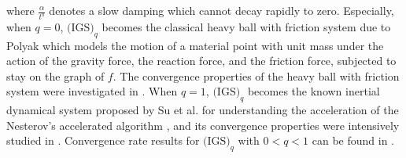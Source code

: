 \documentclass[review]{elsarticle}
\begin{document}
where $\frac{\alpha}{t^{q}}$ denotes a slow damping which  cannot decay rapidly to zero. Especially, when $q=0$, $\text{(IGS)}_{q}$ becomes  the classical heavy ball with friction system due to Polyak \cite{Polyak(1964)} which  models  the motion of a material point with unit mass under the action of the gravity force, the reaction force, and the friction force, subjected to stay on the graph of $f$. The convergence properties of  the heavy ball with friction system  were  investigated in \cite{Alvarezon(2000), Begoutbj(2015)}. When $q=1$, $\text{(IGS)}_{q}$ becomes the known inertial dynamical system proposed by Su et al. \cite{SuBoydandCandes(2016)} for understanding the acceleration of the Nesterov's accelerated algorithm \cite{Nesterov(1983),Nesterov(2013)}, and its convergence properties were intensively studied in  \cite{SuBoydandCandes(2016),AttouchCPR2018,May2017,AttouchCRR2019,Vassilis2018,Aujol2019}. Convergence rate results for $\text{(IGS)}_{q}$ with $0<q<1$ can be found in \cite{Cabot,Cabjde,Hara,Balti2017,Attouchcabot(2017),Sebb,GeB}.
\end{document}
